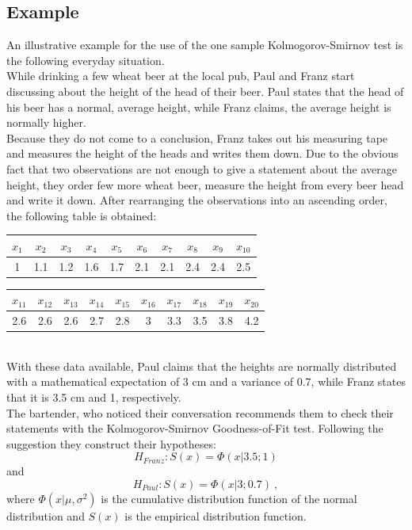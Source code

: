 \documentclass{article}
\theoremstyle{definition}
\begin{document}
\subsection{Example}
An illustrative example for the use of the one sample Kolmogorov-Smirnov test is the following everyday situation.\\
While drinking a few wheat beer at the local pub, Paul and Franz start discussing about the height of the head of their beer.
Paul states that the head of his beer has a normal, average height, while Franz claims, the average height is normally higher.\\
Because they do not come to a conclusion, Franz takes out his measuring tape and measures the height of the heads and writes them down. Due to the obvious fact that two observations are not enough to give a statement about the average height, they order few more wheat beer, measure the height from every beer head and write it down.
After rearranging the observations into an ascending order, the following table is obtained:
\begin{table}[h]
\center
\begin{tabular}{c|c|c|c|c|c|c|c|c|c}
$x_1$	&$x_2$	&$x_3$	&$x_4$	&$x_5$	&$x_6$	&$x_7$	&$x_8$	&$x_9$	&$x_{10}$\\
\hline
1	&1.1	&1.2	&1.6	&1.7	&2.1	&2.1	&2.4	&2.4	&2.5	\\
\end{tabular}
\begin{tabular}{c|c|c|c|c|c|c|c|c|c}
$x_{11}$	&$x_{12}$	&$x_{13}$	&$x_{14}$	&$x_{15}$	&$x_{16}$	&$x_{17}$	&$x_{18}$	&$x_{19}$	&$x_{20}$\\
\hline
2.6	&2.6	&2.6	&2.7	&2.8	&3	&3.3	&3.5	&3.8	&4.2\\
\end{tabular}
\end{table}
\\
With these data available, Paul claims that the heights are normally distributed with a mathematical expectation of 3 cm and a variance of 0.7, while Franz states that it is 3.5 cm and 1, respectively.\\
The bartender, who noticed their conversation recommends them to check their statements with the Kolmogorov-Smirnov Goodness-of-Fit test.
Following the suggestion they construct their hypotheses:
$$H_{Franz} : S(x) = \Phi (x|3.5;1)$$
and
$$H_{Paul} : S(x) = \Phi (x|3;0.7)~,$$
where $\Phi(x|\mu,\sigma^2)$ is the cumulative distribution function of the normal distribution and $S(x)$ is the empirical distribution function.\\
\end{document}
